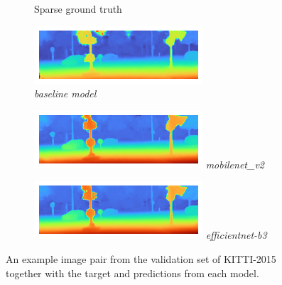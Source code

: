 \documentclass[runningheads]{llncs}
\begin{document}
\begin{figure}[h]
\begin{subfigure}[h]{0.32\linewidth}
        \caption{Sparse ground truth}
     \end{subfigure}
     \hfill
     \begin{subfigure}[h]{0.32\linewidth}
         \centering
        \includegraphics[width=\linewidth]{images/baseline_kitti_alt.png}
        \caption{\textit{baseline model}}
     \end{subfigure}
     \hfill
     \begin{subfigure}[h]{0.32\linewidth}
         \centering
         \includegraphics[width=\linewidth]{images/mobilenet_v2_kitti.png}
         \textit{mobilenet\_v2}
     \end{subfigure}
          \hfill
    \begin{subfigure}[h]{0.32\linewidth}
         \centering
         \includegraphics[width=\linewidth]{images/efficientnet-b3_kitti.png}
         \textit{efficientnet-b3}
     \end{subfigure}
     \caption{An example image pair from the validation set of KITTI-2015 together with the target and predictions from each model. \label{Fig:Finetune_Examples}}
\end{figure}
\end{document}
